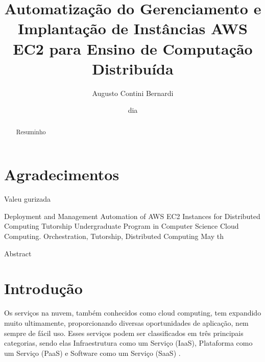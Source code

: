 \documentclass[tg]{mdtufsm}
\title{Automatização do Gerenciamento e Implantação de Instâncias AWS EC2 para Ensino de Computação Distribuída}
\author{Augusto Contini Bernardi}{Cezar}
\institute{Centro de Tecnologia}
\date{dia}{mês}{2016}
\begin{document}
\maketitle


\chapter*{Agradecimentos}
Valeu gurizada

\begin{abstract}
Resuminho
\end{abstract}

\begin{englishabstract}
	{Deployment and Management Automation of AWS EC2 Instances for Distributed Computing Tutorship}
	{Undergraduate Program in Computer Science}
	{Cloud Computing. Orchestration, Tutorship, Distributed Computing}
	{May}
	{th}
	
Abstract
	
\end{englishabstract}


\tableofcontents
\listoffigures

\setlength{\baselineskip}{1.5\baselineskip}

\chapter{Introdução}


Os serviços na nuvem, também conhecidos como cloud computing, tem expandido muito ultimamente, proporcionando diversas oportunidades de aplicação, nem sempre de fácil uso. Esses serviços podem ser classificados em três principais categorias, sendo elas Infraestrutura como um Serviço (IaaS), Plataforma como um Serviço (PaaS) e Software como um Serviço (SaaS) \cite{xaas2}.
\end{document}
